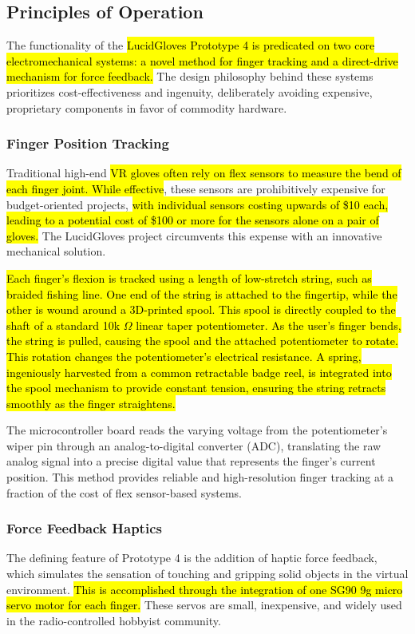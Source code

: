 \documentclass{article}
\begin{document}
\subsection{Principles of Operation}
The functionality of the \hl{LucidGloves Prototype 4 is predicated on two core electromechanical systems: a novel method for finger tracking and a direct-drive mechanism for force feedback.} The design philosophy behind these systems prioritizes cost-effectiveness and ingenuity, deliberately avoiding expensive, proprietary components in favor of commodity hardware.

\subsubsection{Finger Position Tracking}
Traditional high-end \hl{VR gloves often rely on flex sensors to measure the bend of each finger joint. While effective}, these sensors are prohibitively expensive for budget-oriented projects, \hl{with individual sensors costing upwards of \$10 each, leading to a potential cost of \$100 or more for the sensors alone on a pair of gloves.} The LucidGloves project circumvents this expense with an innovative mechanical solution.

\hl{Each finger's flexion is tracked using a length of low-stretch string, such as braided fishing line. One end of the string is attached to the fingertip, while the other is wound around a 3D-printed spool. This spool is directly coupled to the shaft of a standard 10k $\Omega$ linear taper potentiometer. As the user's finger bends, the string is pulled, causing the spool and the attached potentiometer to rotate. This rotation changes the potentiometer's electrical resistance. A spring, ingeniously harvested from a common retractable badge reel, is integrated into the spool mechanism to provide constant tension, ensuring the string retracts smoothly as the finger straightens.}

The microcontroller board reads the varying voltage from the potentiometer's wiper pin through an analog-to-digital converter (ADC), translating the raw analog signal into a precise digital value that represents the finger's current position. This method provides reliable and high-resolution finger tracking at a fraction of the cost of flex sensor-based systems.

\subsubsection{Force Feedback Haptics}
The defining feature of Prototype 4 is the addition of haptic force feedback, which simulates the sensation of touching and gripping solid objects in the virtual environment. \hl{This is accomplished through the integration of one SG90 9g micro servo motor for each finger.} These servos are small, inexpensive, and widely used in the radio-controlled hobbyist community.
\end{document}
